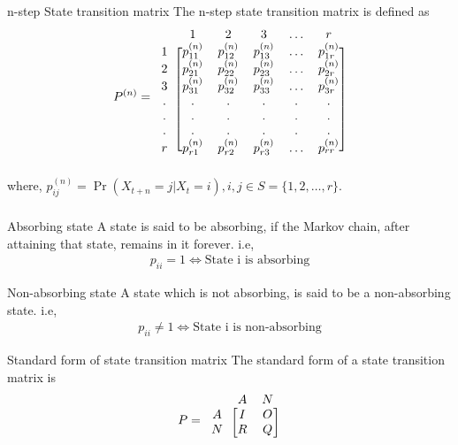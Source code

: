 \documentclass{beamer}
\providecommand{\pr}[1]{\ensuremath{\Pr\left(#1\right)}}
\begin{document}
\begin{frame}
\frametitle{}
\begin{block}{n-step State transition matrix}
The n-step state transition matrix is defined as
\begin{align}
\label{eq:pngen}
    P^{(n)}=\begin{blockarray}{cccccc}
&1 & 2 & 3 & \dots & r  \\
\begin{block}{c[ccccc]}
  1 & p_{11}^{(n)} & p_{12}^{(n)} & p_{13}^{(n)} & \dots & p_{1r}^{(n)} \\
  2 & p_{21}^{(n)} & p_{22}^{(n)} & p_{23}^{(n)} & \dots & p_{2r}^{(n)} \\
  3 & p_{31}^{(n)} & p_{32}^{(n)} & p_{33}^{(n)} & \dots & p_{3r}^{(n)} \\
  . & . & . & . & . & . \\
  . & . & . & . & . & . \\
  . & . & . & . & . & . \\
  r & p_{r1}^{(n)} & p_{r2}^{(n)} & p_{r3}^{(n)} & \dots & p_{rr}^{(n)} \\
\end{block}
\end{blockarray}
\end{align}
where, $p_{ij}^{(n)}=\pr{X_{t+n}=j|X_{t}=i},i,j\in S=\{1,2,\dots,r\}$. 
\end{block}
\end{frame}

\begin{frame}
\frametitle{}
\begin{block}{Absorbing state}
A state is said to be absorbing, if the Markov chain, after attaining that state, remains in it forever. i.e, 
\begin{align}
    p_{ii}=1\Leftrightarrow\text{State i is absorbing}
\end{align}
\end{block}
\begin{block}{Non-absorbing state}
A state which is not absorbing, is said to be a non-absorbing state. i.e,
\begin{align}
    p_{ii}\neq 1\Leftrightarrow\text{State i is non-absorbing}
\end{align}
\end{block}
\begin{block}{Standard form of state transition matrix}
The standard form of a state transition matrix is
\begin{align}
\label{eq:std}
    P=\begin{blockarray}{ccc}
&A & N \\
\begin{block}{c[cc]}
  A & I & O  \\
  N & R & Q \\
\end{block}
\end{blockarray}
\end{align}
\end{block}
\end{frame}
\end{document}
